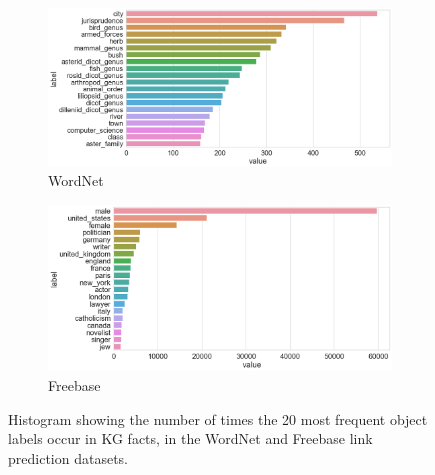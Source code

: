 \begin{figure}
	\begin{subfigure}[b]{.5\linewidth}
   		\centering
    		\includegraphics[width=1.0\linewidth, height=0.6\linewidth]{Wordnet_Object_Counts}
		\captionsetup{justification=centering}
		\caption{WordNet}
	\end{subfigure}
	\begin{subfigure}[b]{.5\linewidth}
   		\centering
		\includegraphics[width=1.0\linewidth, height=0.6\linewidth]{Freebase_Object_Counts}
		\captionsetup{justification=centering}
		\caption{Freebase}
	\end{subfigure}
	\captionsetup{justification=centering}
	\caption{Histogram showing the number of times the 20 most frequent object labels occur in KG facts, in the WordNet and Freebase link prediction datasets.}
\end{figure}

